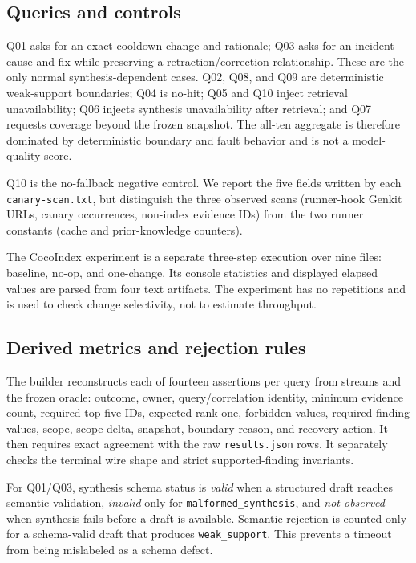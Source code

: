 \documentclass[10pt,twocolumn]{article}
\newcommand{\code}[1]{\texttt{#1}}
\begin{document}
\subsection{Queries and controls}
Q01 asks for an exact cooldown change and rationale; Q03 asks for an incident cause and fix while preserving a retraction/correction relationship.  These are the only normal synthesis-dependent cases.  Q02, Q08, and Q09 are deterministic weak-support boundaries; Q04 is no-hit; Q05 and Q10 inject retrieval unavailability; Q06 injects synthesis unavailability after retrieval; and Q07 requests coverage beyond the frozen snapshot.  The all-ten aggregate is therefore dominated by deterministic boundary and fault behavior and is not a model-quality score.

Q10 is the no-fallback negative control.  We report the five fields written by each \code{canary-scan.txt}, but distinguish the three observed scans (runner-hook Genkit URLs, canary occurrences, non-index evidence IDs) from the two runner constants (cache and prior-knowledge counters).

The CocoIndex experiment is a separate three-step execution over nine files: baseline, no-op, and one-change.  Its console statistics and displayed elapsed values are parsed from four text artifacts.  The experiment has no repetitions and is used to check change selectivity, not to estimate throughput.

\subsection{Derived metrics and rejection rules}
The builder reconstructs each of fourteen assertions per query from streams and the frozen oracle: outcome, owner, query/correlation identity, minimum evidence count, required top-five IDs, expected rank one, forbidden values, required finding values, scope, scope delta, snapshot, boundary reason, and recovery action.  It then requires exact agreement with the raw \code{results.json} rows.  It separately checks the terminal wire shape and strict supported-finding invariants.

For Q01/Q03, synthesis schema status is \emph{valid} when a structured draft reaches semantic validation, \emph{invalid} only for \code{malformed\_synthesis}, and \emph{not observed} when synthesis fails before a draft is available.  Semantic rejection is counted only for a schema-valid draft that produces \code{weak\_support}.  This prevents a timeout from being mislabeled as a schema defect.
\end{document}
